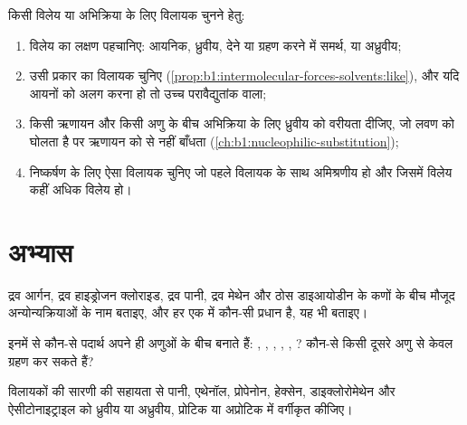 \begin{method}[विलायक चुनना]\label{met:b1:intermolecular-forces-solvents:choose}
किसी विलेय या अभिक्रिया के लिए विलायक चुनने हेतु:
\begin{enumerate}
  \item विलेय का लक्षण पहचानिए: आयनिक, ध्रुवीय,  देने या
        ग्रहण करने में समर्थ, या अध्रुवीय;
  \item उसी प्रकार का विलायक चुनिए (\cref{prop:b1:intermolecular-forces-solvents:like}),
        और यदि आयनों को अलग करना हो तो उच्च परावैद्युतांक वाला;
  \item किसी ऋणायन और किसी अणु के बीच अभिक्रिया के लिए ध्रुवीय
         को वरीयता दीजिए, जो लवण को घोलता है पर ऋणायन को
         से नहीं बाँधता (\cref{ch:b1:nucleophilic-substitution});
  \item निष्कर्षण के लिए ऐसा विलायक चुनिए जो पहले विलायक के साथ अमिश्रणीय हो
        और जिसमें विलेय कहीं अधिक विलेय हो।
\end{enumerate}
\end{method}

\section{अभ्यास}

\begin{exercise}[$\star$]\label{exo:b1:intermolecular-forces-solvents:1}
द्रव आर्गन, द्रव हाइड्रोजन क्लोराइड, द्रव पानी, द्रव मेथेन और ठोस
डाइआयोडीन के कणों के बीच मौजूद अन्योन्यक्रियाओं के नाम बताइए, और हर एक में
कौन-सी प्रधान है, यह भी बताइए।
\end{exercise}

\begin{exercise}[$\star$]\label{exo:b1:intermolecular-forces-solvents:2}
इनमें से कौन-से पदार्थ अपने ही अणुओं के बीच  बनाते हैं:
, , , , ,
? कौन-से किसी दूसरे अणु से केवल  ग्रहण कर सकते हैं?
\end{exercise}

\begin{exercise}[$\star$]\label{exo:b1:intermolecular-forces-solvents:3}
विलायकों की सारणी की सहायता से पानी, एथेनॉल, प्रोपेनोन, हेक्सेन,
डाइक्लोरोमेथेन और ऐसीटोनाइट्राइल को ध्रुवीय या अध्रुवीय, प्रोटिक या अप्रोटिक में वर्गीकृत कीजिए।
\end{exercise}


